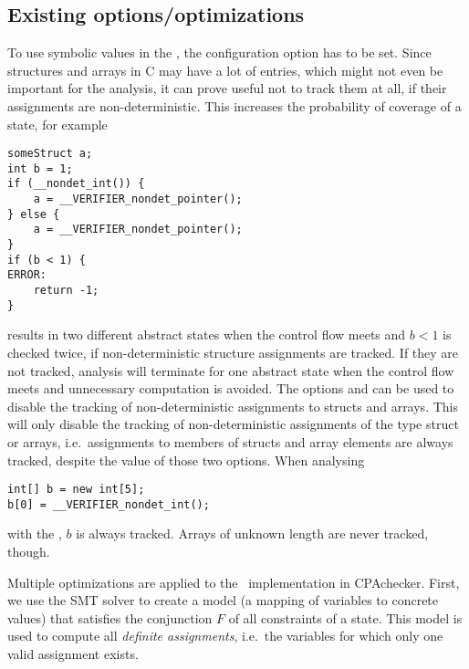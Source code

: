 \subsection{Existing options/optimizations}
To use symbolic values in the , the configuration option  has to be set.
Since structures and arrays in C may have a lot of entries, which might not even be important for the analysis,
it can prove useful not to track them at all, if their assignments are non-deterministic.
This increases the probability of coverage of a state, for example
\begin{lstlisting}
someStruct a;
int b = 1;
if (__nondet_int()) {
	a = __VERIFIER_nondet_pointer();
} else {
	a = __VERIFIER_nondet_pointer();
}
if (b < 1) {
ERROR:
	return -1;
}
\end{lstlisting}
results in two different abstract states when the control flow meets and $b < 1$ is checked twice, if non-deterministic structure assignments are tracked.
If they are not tracked, analysis will terminate for one abstract state when the control flow meets and unnecessary computation is avoided.
The options  and 
can be used to disable the tracking of non-deterministic assignments to structs and arrays.
This will only disable the tracking of non-deterministic assignments of the type struct or arrays, i.e.\ assignments to members of structs and array elements
are always tracked, despite the value of those two options.
When analysing
\begin{lstlisting}
int[] b = new int[5];
b[0] = __VERIFIER_nondet_int();
\end{lstlisting}
with the \symbolicExecutionCPA, $b$ is always tracked.
Arrays of unknown length are never tracked, though.

Multiple optimizations are applied to the \constraintsCPA\ implementation in CPAchecker.
First, we use the SMT solver to create a model (a mapping of variables to concrete values) that satisfies the conjunction $F$ of all constraints of a state.
This model is used to compute all \emph{definite assignments}, i.e.\ the variables for which only one valid assignment exists.

